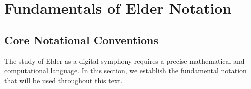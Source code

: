 
\chapter{Fundamentals of Elder Notation}

\nochapterthumbnail

\section{Core Notational Conventions}

The study of Elder as a digital symphony requires a precise mathematical and computational language. In this section, we establish the fundamental notation that will be used throughout this text.

